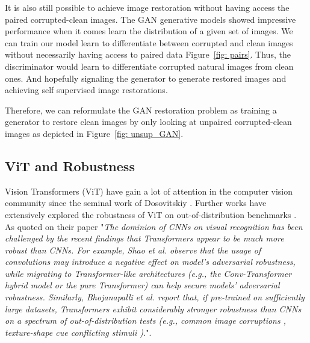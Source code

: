 \par It is also still possible to achieve image restoration without having access the paired corrupted-clean images. The GAN generative models showed impressive performance when it comes learn the distribution of a given set of images. We can train our model learn to differentiate between corrupted and clean images without necessarily having access to paired data Figure~\ref{fig: pairs}. Thus, the discriminator would learn to differentiate corrupted natural images from clean ones. And hopefully signaling the generator to generate restored images and achieving self supervised image restorations.
\par Therefore, we can reformulate the GAN restoration problem as training a generator to restore clean images by only looking at unpaired corrupted-clean images as depicted in Figure~\ref{fig: unsup_GAN}.
\subsection*{ViT and Robustness}
\par Vision Transformers (ViT) have gain a lot of attention in the computer vision community since the seminal work of Dosovitskiy \etal \cite{dosovitskiy2020image}. Further works \cite{bai2021transformers} have extensively explored the robustness of ViT on out-of-distribution benchmarks \cite{hendrycks2018benchmarking}. As quoted on their paper
"\emph{The dominion of CNNs on visual recognition has been challenged by the recent findings that Transformers appear to be much more robust than CNNs. For example, Shao et al. \cite{shao2021adversarial} observe that the usage of convolutions may introduce a negative effect on model's adversarial robustness, while migrating to Transformer-like architectures (e.g., the Conv-Transformer hybrid model or the pure Transformer) can help secure models’ adversarial robustness. Similarly, Bhojanapalli et al. \cite{bhojanapalli2021understanding} report that, if pre-trained on sufficiently large datasets, Transformers exhibit considerably stronger robustness than CNNs on a spectrum of out-of-distribution tests (e.g., common image corruptions \cite{hendrycks2018benchmarking}, texture-shape cue conflicting stimuli \cite{geirhos2018imagenet}).}".
